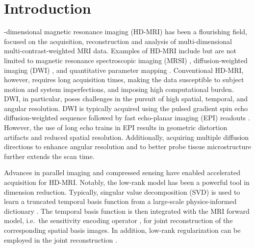 \documentclass[journal,twoside,web]{ieeecolor}
\begin{document}
	\section{Introduction}
	\label{SEC:INTRO}
	-dimensional magnetic resonance imaging (HD-MRI)
	has been a flourishing field,
	focused on the acquisition, reconstruction and analysis of
	multi-dimensional multi-contrast-weighted MRI data.
	Examples of HD-MRI include but are not limited to
	magnetic resonance spectroscopic imaging (MRSI)
	\cite{brown_1982_mrsi},
	diffusion-weighted imaging (DWI)
	\cite{jones_2010_diff},
	and quantitative parameter mapping
	\cite{doneva_2010_moba,ma_2013_mrf}.
	Conventional HD-MRI, however, requires long acquisition times,
	making the data susceptible to subject motion
	and system imperfections, and imposing high computational burden.
	DWI, in particular, poses challenges in the pursuit of
	high spatial, temporal, and angular resolution.
	DWI is typically acquired using
	the pulsed gradient spin echo diffusion-weighted sequence 
	\cite{stejskal_1965_pgse}
	followed by fast echo-planar imaging (EPI) readouts
	\cite{mansfield_1977_epi}.
	However, the use of long echo trains in EPI results in
	geometric distortion artifacts and reduced spatial resolution.
	Additionally, acquiring multiple diffusion directions
	to enhance angular resolution and
	to better probe tissue microstructure further extends the scan time.

	Advances in parallel imaging
	\cite{roemer_1990_pi,sodickson_1997_smash,
	pruessmann_1999_sense,pruessmann_2001_gsense,griswold_2002_grappa}
	and compressed sensing
	\cite{lustig_2007_cs,block_2007_cs,liang_2007_psf}
	have enabled accelerated acquisition for HD-MRI.
	Notably, the low-rank model \cite{cai_2010_svt}
	has been a powerful tool in dimension reduction.
	Typically, singular value decomposition (SVD) is used to
	learn a truncated temporal basis function from
	a large-scale physics-informed dictionary
	\cite{huang_2012_t2basis,lam_2014_spice,mcgivney_2014_svdmrf}.
	The temporal basis function is then integrated
	with the MRI forward model,
	i.e.~the sensitivity encoding operator \cite{pruessmann_2001_gsense},
	for joint reconstruction of the corresponding spatial basis images.
	In addition, low-rank regularization can be employed
	in the joint reconstruction \cite{tamir_2017_t2shuffling}.
\end{document}

